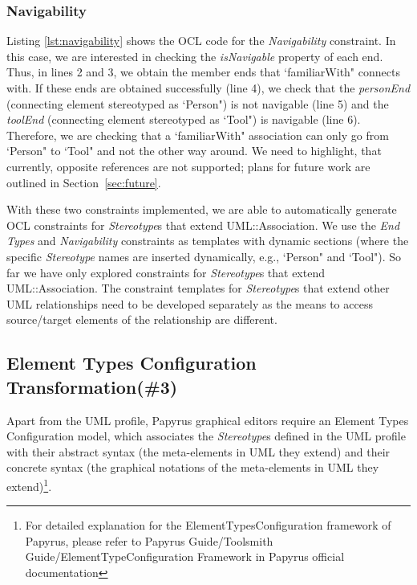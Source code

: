 \subsubsection{Navigability}
Listing \ref{lst:navigability} shows the OCL code for the \emph{Navigability} constraint. 
In this case, we are interested in checking the \emph{isNavigable} property of each end. 
Thus, in lines 2 and 3, we obtain the member ends that `familiarWith" connects with. 
If these ends are obtained successfully (line 4), we check that the \emph{personEnd} (connecting element stereotyped as `Person") is not navigable (line 5) and the \emph{toolEnd} (connecting element stereotyped as `Tool") is navigable (line 6). 
Therefore, we are checking that a `familiarWith" association can only go from `Person" to `Tool" and not the other way around. 
We need to highlight, that currently, opposite references are not supported; plans for future work are outlined in Section~\ref{sec:future}.

\begin{figure}[h]
	
\end{figure}

With these two constraints implemented, we are able to automatically generate OCL constraints for \textit{Stereotype}s that extend UML::Association. 
We use the \emph{End Types} and \emph{Navigability} constraints as templates with dynamic sections (where the specific \textit{Stereotype} names are inserted dynamically, e.g., `Person" and `Tool"). 
So far we have only explored constraints for \textit{Stereotype}s that extend UML::Association. 
The constraint templates for \textit{Stereotype}s that extend other UML relationships need to be developed separately as the means to access source/target elements of the relationship are different.

\subsection{Element Types  Configuration Transformation(\#3)}
\label{sec:elementTypes}
Apart from the UML profile, Papyrus graphical editors require an Element Types Configuration model, which associates the \textit{Stereotype}s defined in the UML profile with their abstract syntax (the meta-elements in UML they extend) and their concrete syntax (the graphical notations of the meta-elements in UML they extend)\footnote{For detailed explanation for the ElementTypesConfiguration framework of Papyrus, please refer to Papyrus Guide/Toolsmith Guide/ElementTypeConfiguration Framework in Papyrus official documentation}. 

